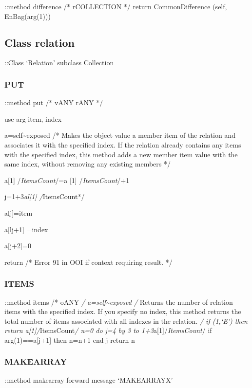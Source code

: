 ::method difference /* rCOLLECTION */ return CommonDifference (self,
EnBag(arg(1)))

\subsection{Class relation}\label{class-relation}

::Class `Relation' subclass Collection

\subsubsection{PUT}\label{put-3}

::method put /* vANY rANY */

use arg item, index

a=self\textasciitilde exposed /* Makes the object value a member item of
the relation and associates it with the specified index. If the relation
already contains any items with the specified index, this method adds a
new member item value with the same index, without removing any existing
members */

a{[}1{]} /\emph{ItemsCount}/=a {[}1{]} /\emph{ItemsCount}/+1

j=1+3\emph{al{[}1{]} /}ItemsCount*/

alj{]}=item

a{[}lj+1{]} =index

a{[}j+2{]}=0

return /* Error 91 in OOI if context requiring result. */

\subsubsection{ITEMS}\label{items-1}

::method items /* oANY \emph{/ a=self\textasciitilde exposed /} Returns
the number of relation items with the specified index. If you specify no
index, this method returns the total number of items associated with all
indexes in the relation. \emph{/ if \arg(1,`E') then return
a{[}1{]}/}ItemsCount\emph{/ n=0 do j=4 by 3 to
1+3}a{[}1{]}/\emph{ItemsCount}/ if arg(1)==a{[}j+1{]} then n=n+1 end j
return n

\subsubsection{MAKEARRAY}\label{makearray-1}

::method makearray forward message `MAKEARRAYX'

